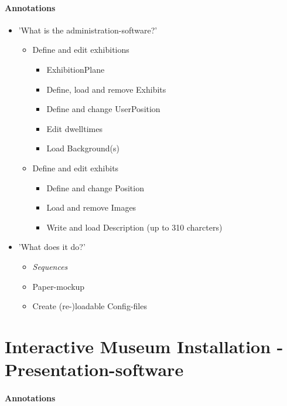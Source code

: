 \paragraph{Annotations}

\begin{itemize}
	\item 'What is the administration-software?'
	\begin{itemize}
		\item Define and edit exhibitions
		\begin{itemize}
			\item ExhibitionPlane
			\item Define, load and remove Exhibits
			\item Define and change UserPosition
			\item Edit dwelltimes
			\item Load Background(s)
		\end{itemize}
		\item Define and edit exhibits
		\begin{itemize}
			\item Define and change Position
			\item Load and remove Images
			\item Write and load Description (up to 310 charcters)
		\end{itemize}
	\end{itemize}
	\item 'What does it do?'
	\begin{itemize}
		\item \textit{Sequences}
		\item Paper-mockup
		\item Create (re-)loadable Config-files
	\end{itemize}
\end{itemize}



\section{Interactive Museum Installation - Presentation-software}
\label{implementation_presentation}

\paragraph{Annotations}

